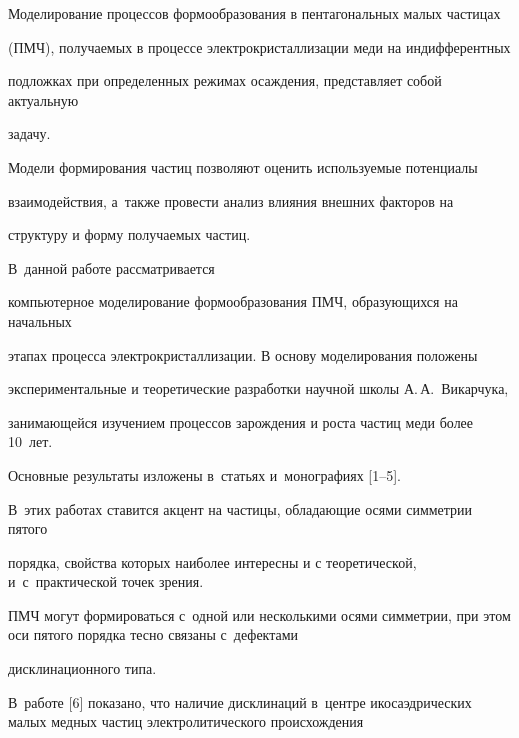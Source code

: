 


\date{30/VI/2009}






\maketitle





Моделирование процессов формообразования в пентагональных малых частицах

(ПМЧ), получаемых в процессе электрокристаллизации меди на индифферентных

подложках при определенных режимах осаждения, представляет собой актуальную

задачу.

Модели формирования частиц позволяют оценить используемые потенциалы

взаимодействия, а~также провести анализ влияния внешних факторов на

структуру и форму получаемых частиц.

В~данной работе рассматривается

компьютерное моделирование формообразования ПМЧ, образующихся на начальных

этапах процесса электрокристаллизации. В основу моделирования положены

экспериментальные и теоретические разработки научной школы А.\,А.~Викарчука,

занимающейся изучением процессов зарождения и роста частиц меди более 10~лет.

Основные результаты изложены в~статьях и~монографиях [1--5].

В~этих работах ставится акцент на частицы, обладающие осями симметрии пятого

порядка, свойства которых наиболее интересны и с теоретической, и~с~практической точек зрения.

ПМЧ могут формироваться с~одной или несколькими осями симметрии, при этом оси пятого порядка тесно связаны с~дефектами

дисклинационного типа.

В~работе [6] показано, что наличие дисклинаций в~центре икосаэдрических малых медных частиц электролитического происхождения

